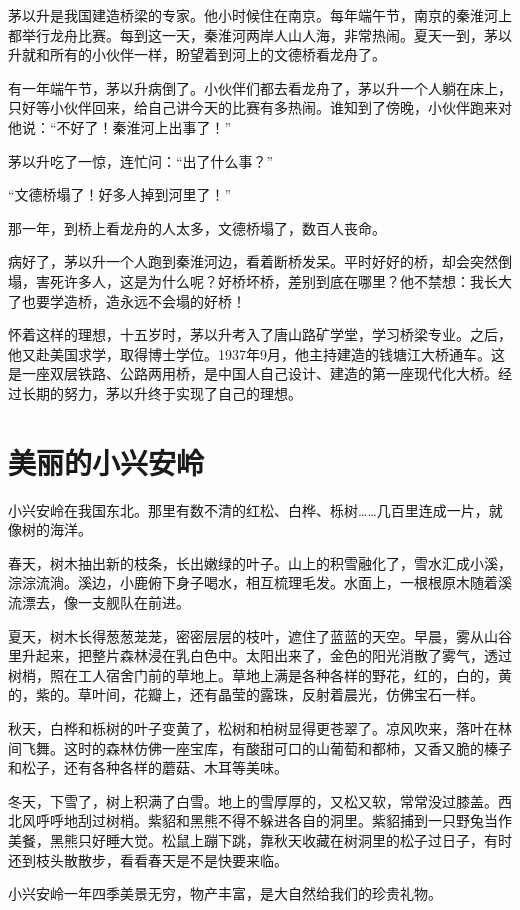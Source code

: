\documentclass[12pt,UTF-8,openany]{ctexbook}
\begin{document}
\begin{Large}
    
    茅以升是我国建造桥梁的专家。他小时候住在南京。每年端午节，南京的秦淮河上都举行龙舟比赛。每到这一天，秦淮河两岸人山人海，非常热闹。夏天一到，茅以升就和所有的小伙伴一样，盼望着到河上的文德桥看龙舟了。
    
    有一年端午节，茅以升病倒了。小伙伴们都去看龙舟了，茅以升一个人躺在床上，只好等小伙伴回来，给自己讲今天的比赛有多热闹。谁知到了傍晚，小伙伴跑来对他说：“不好了！秦淮河上出事了！”
    
    茅以升吃了一惊，连忙问：“出了什么事？”
    
    “文德桥塌了！好多人掉到河里了！”
    
    那一年，到桥上看龙舟的人太多，文德桥塌了，数百人丧命。
    
    病好了，茅以升一个人跑到秦淮河边，看着断桥发呆。平时好好的桥，却会突然倒塌，害死许多人，这是为什么呢？好桥坏桥，差别到底在哪里？他不禁想：我长大了也要学造桥，造永远不会塌的好桥！
    
    怀着这样的理想，十五岁时，茅以升考入了唐山路矿学堂，学习桥梁专业。之后，他又赴美国求学，取得博士学位。1937年9月，他主持建造的钱塘江大桥通车。这是一座双层铁路、公路两用桥，是中国人自己设计、建造的第一座现代化大桥。经过长期的努力，茅以升终于实现了自己的理想。
    
\end{Large}

\chapter{美丽的小兴安岭}

\begin{Large}
    
    小兴安岭在我国东北。那里有数不清的红松、白桦、栎树……几百里连成一片，就像树的海洋。
    
    春天，树木抽出新的枝条，长出嫩绿的叶子。山上的积雪融化了，雪水汇成小溪，淙淙流淌。溪边，小鹿俯下身子喝水，相互梳理毛发。水面上，一根根原木随着溪流漂去，像一支舰队在前进。
    
    夏天，树木长得葱葱茏茏，密密层层的枝叶，遮住了蓝蓝的天空。早晨，雾从山谷里升起来，把整片森林浸在乳白色中。太阳出来了，金色的阳光消散了雾气，透过树梢，照在工人宿舍门前的草地上。草地上满是各种各样的野花，红的，白的，黄的，紫的。草叶间，花瓣上，还有晶莹的露珠，反射着晨光，仿佛宝石一样。
    
    秋天，白桦和栎树的叶子变黄了，松树和柏树显得更苍翠了。凉风吹来，落叶在林间飞舞。这时的森林仿佛一座宝库，有酸甜可口的山葡萄和都柿，又香又脆的榛子和松子，还有各种各样的蘑菇、木耳等美味。
    
    冬天，下雪了，树上积满了白雪。地上的雪厚厚的，又松又软，常常没过膝盖。西北风呼呼地刮过树梢。紫貂和黑熊不得不躲进各自的洞里。紫貂捕到一只野兔当作美餐，黑熊只好睡大觉。松鼠上蹦下跳，靠秋天收藏在树洞里的松子过日子，有时还到枝头散散步，看看春天是不是快要来临。
    
    小兴安岭一年四季美景无穷，物产丰富，是大自然给我们的珍贵礼物。
    
\end{Large}
\end{document}
